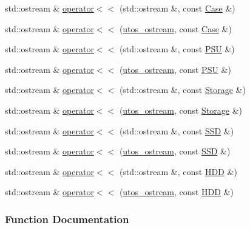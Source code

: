 \begin{DoxyCompactItemize}
std\+::ostream \& \mbox{\hyperlink{_parts_8h_a095fc6bc853799360bba8d744652202a}{operator$<$$<$}} (std\+::ostream \&, const \mbox{\hyperlink{class_case}{Case}} \&)
\item 
std\+::ostream \& \mbox{\hyperlink{_parts_8h_ad6296c753aa62252b017bf4c78043d19}{operator$<$$<$}} (\mbox{\hyperlink{structutos__ostream}{utos\+\_\+ostream}}, const \mbox{\hyperlink{class_case}{Case}} \&)
\item 
std\+::ostream \& \mbox{\hyperlink{_parts_8h_a1f7600c301fc3b2fbca76e13f0631ed7}{operator$<$$<$}} (std\+::ostream \&, const \mbox{\hyperlink{class_p_s_u}{P\+SU}} \&)
\item 
std\+::ostream \& \mbox{\hyperlink{_parts_8h_afea0ac8a7df9128093f476a85a5916ac}{operator$<$$<$}} (\mbox{\hyperlink{structutos__ostream}{utos\+\_\+ostream}}, const \mbox{\hyperlink{class_p_s_u}{P\+SU}} \&)
\item 
std\+::ostream \& \mbox{\hyperlink{_parts_8h_a2757424af823d03a26605c202c8c7507}{operator$<$$<$}} (std\+::ostream \&, const \mbox{\hyperlink{class_storage}{Storage}} \&)
\item 
std\+::ostream \& \mbox{\hyperlink{_parts_8h_a89feddfbb00e7f9938b507838513caae}{operator$<$$<$}} (\mbox{\hyperlink{structutos__ostream}{utos\+\_\+ostream}}, const \mbox{\hyperlink{class_storage}{Storage}} \&)
\item 
std\+::ostream \& \mbox{\hyperlink{_parts_8h_a58786e0f5831ee1afe7272e37221a12a}{operator$<$$<$}} (std\+::ostream \&, const \mbox{\hyperlink{class_s_s_d}{S\+SD}} \&)
\item 
std\+::ostream \& \mbox{\hyperlink{_parts_8h_aa671da3e5a8c60889bcb6ce6367758fc}{operator$<$$<$}} (\mbox{\hyperlink{structutos__ostream}{utos\+\_\+ostream}}, const \mbox{\hyperlink{class_s_s_d}{S\+SD}} \&)
\item 
std\+::ostream \& \mbox{\hyperlink{_parts_8h_aa60040b0f441945779699ec9ef31d0e5}{operator$<$$<$}} (std\+::ostream \&, const \mbox{\hyperlink{class_h_d_d}{H\+DD}} \&)
\item 
std\+::ostream \& \mbox{\hyperlink{_parts_8h_a3cd50fc84d17bbd6f412f72c5b5cbbfc}{operator$<$$<$}} (\mbox{\hyperlink{structutos__ostream}{utos\+\_\+ostream}}, const \mbox{\hyperlink{class_h_d_d}{H\+DD}} \&)
\end{DoxyCompactItemize}


\subsubsection{Function Documentation}
\mbox{\label{_parts_8h_a41bf212a0001ee2061948fe863a2295b}} 
